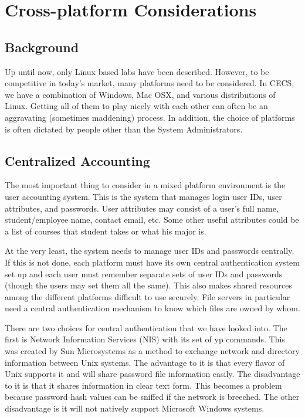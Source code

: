 \section{Cross-platform Considerations} \label{sec:crossplatform}
\subsection{Background}
Up until now, only Linux based labs have been described.  However, to be competitive in today's market, many platforms need to be considered.  In CECS, we have a combination of Windows, Mac OSX, and various distributions of Linux.   Getting all of them to play nicely with each other can often be an aggravating (sometimes maddening) process.  In addition, the choice of platforms is often dictated by people other than the System Administrators. 
\subsection{Centralized Accounting}
The most important thing to consider in a mixed platform environment is the user accounting system.  This is the system that manages login user IDs, user attributes, and passwords.  User attributes may consist of a user's full name, student/employee name, contact email, etc.  Some other useful attributes could be a list of courses that student takes or what his major is.  

At the very least, the system needs to manage user IDs and passwords centrally.  If this is not done, each platform must have its own central authentication system set up and each user must remember separate sets of user IDs and passwords (though the users may set them all the same).  This also makes shared resources among the different platforms difficult to use securely.  File servers in particular need a central authentication mechanism to know which files are owned by whom.  

There are two choices for central authentication that we have looked into.  The first is Network Information Services (NIS) with its set of yp commands.  This was created by Sun Microsystems as a method to exchange network and directory information between Unix systems.  The advantage to it is that every flavor of Unix supports it and will share password file information easily.  The disadvantage to it is that it shares information in clear text form.  This becomes a problem because password hash values can be sniffed if the network is breeched.  The other disadvantage is it will not natively support Microsoft Windows systems.  

